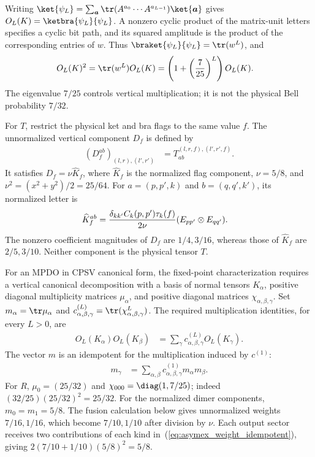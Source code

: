 Writing $\ket{\psi_L}=\sum_{\boldsymbol a}
    \tr(A^{a_0}\cdots A^{a_{L-1}})\ket{\boldsymbol a}$ gives
$O_L(K)=\ketbra{\psi_L}{\psi_L}$.
A nonzero cyclic product of the matrix-unit letters specifies a cyclic
bit path, and its squared amplitude is the product of the corresponding
entries of $w$. Thus $\braket{\psi_L}{\psi_L}=\tr(w^L)$, and
\begin{align}
    O_L(K)^2 & =\tr(w^L)O_L(K)
    =\left(1+\left(\frac7{25}\right)^L\right)O_L(K).
    \label{eq:asymex_K_product}
\end{align}
The eigenvalue $7/25$ controls vertical multiplication; it is not the
physical Bell probability $7/32$.

For $T$, restrict the physical ket and bra flags to the same value $f$.
The unnormalized vertical component $D_f$ is defined by
\begin{align}
    (D_f^{ab})_{(l,r),(l',r')}
     & =T^{(l,r,f),(l',r',f)}_{ab}.
    \label{eq:asymex_dimer_dictionary}
\end{align}
It satisfies $D_f=\nu\widehat K_f$, where $\widehat K_f$ is the
normalized flag component, $\nu=5/8$, and
$\nu^2=(x^2+y^2)/2=25/64$.
For $a=(p,p',k)$ and $b=(q,q',k')$, its normalized letter is
\begin{align}
    \widehat K_f^{ab} & =\frac{\delta_{kk'}C_k(p,p')\tau_k(f)}{2\nu}
    (E_{pp'}\otimes E_{qq'}).
    \notag
\end{align}
The nonzero coefficient magnitudes of $D_f$ are $1/4,3/16$,
whereas those of $\widehat K_f$ are $2/5,3/10$.
Neither component is the physical tensor $T$.

For an MPDO in CPSV canonical form, the fixed-point characterization
requires a vertical canonical decomposition with a basis of normal tensors
$K_\alpha$, positive diagonal multiplicity matrices $\mu_\alpha$, and
positive diagonal matrices $\chi_{\alpha,\beta,\gamma}$.
Set $m_\alpha=\tr\mu_\alpha$ and
$c_{\alpha,\beta,\gamma}^{(L)}=\tr(\chi_{\alpha,\beta,\gamma}^L)$.
The required multiplication identities, for every $L>0$, are
\begin{align}
    O_L(K_\alpha)O_L(K_\beta)
     & =\sum_\gamma c_{\alpha,\beta,\gamma}^{(L)}O_L(K_\gamma).
    \label{eq:asymex_vertical_product}
\end{align}
The vector $m$ is an idempotent for the multiplication induced by
$c^{(1)}$:
\begin{align}
    m_\gamma
     & =\sum_{\alpha,\beta}
    c_{\alpha,\beta,\gamma}^{(1)}m_\alpha m_\beta.
    \label{eq:asymex_weight_idempotent}
\end{align}
For $R$, $\mu_0=(25/32)$ and $\chi_{000}=\diag(1,7/25)$;
indeed $(32/25)(25/32)^2=25/32$.
For the normalized dimer components, $m_0=m_1=5/8$.
The fusion calculation below gives unnormalized weights $7/16,1/16$,
which become $7/10,1/10$ after division by $\nu$. Each output sector
receives two contributions of each kind
in~(\ref{eq:asymex_weight_idempotent}), giving
$2(7/10+1/10)(5/8)^2=5/8$.

